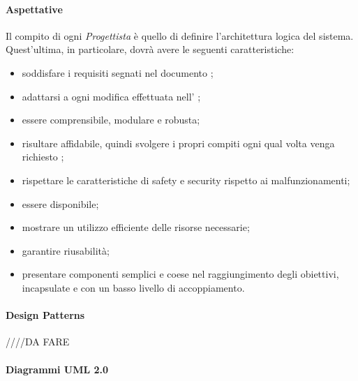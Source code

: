 \paragraph{Aspettative}

Il compito di ogni \textit{Progettista} è quello di definire l'architettura logica del sistema.  Quest'ultima,  in particolare,  dovrà avere le seguenti caratteristiche:
\begin{itemize}

\item soddisfare i requisiti segnati nel documento \AdR;

\item adattarsi a ogni modifica effettuata nell' \AdR;

\item essere comprensibile,  modulare e robusta;

\item risultare affidabile,  quindi svolgere i propri compiti ogni qual volta venga richiesto ;

\item rispettare le caratteristiche di safety e security rispetto ai malfunzionamenti;

\item essere disponibile;

\item mostrare un utilizzo efficiente delle risorse necessarie;

\item garantire riusabilità;

\item presentare componenti semplici e coese nel raggiungimento degli obiettivi,  incapsulate e con un basso livello di accoppiamento.

\end{itemize}

\paragraph{Design Patterns}

////DA FARE

\paragraph{Diagrammi UML 2.0}

